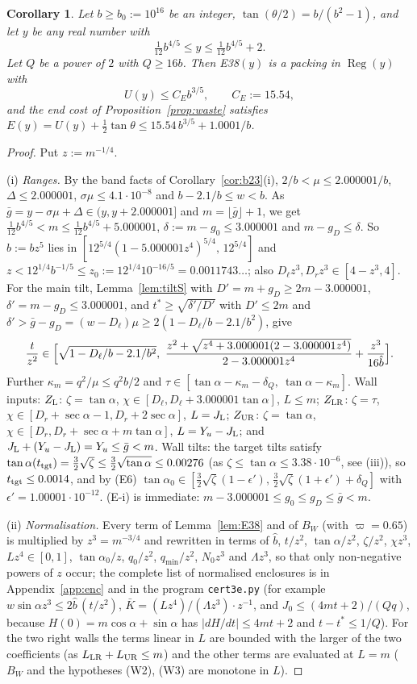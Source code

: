 \documentclass[11pt]{amsart}
\newcommand{\Reg}{\operatorname{Reg}}
\newcommand{\ca}{\cos\alpha}
\newcommand{\sa}{\sin\alpha}
\newcommand{\ta}{\tan\alpha}
\newcommand{\se}{\sec\alpha}
\newcommand{\taz}{\tan\alpha_0}
\newcommand{\Kb}{\bar K}
\newtheorem{corollary}[theorem]{Corollary}
\theoremstyle{definition}
\theoremstyle{remark}
\numberwithin{equation}{section}
\begin{document}
\begin{corollary}\label{cor:b35}
Let $b\ge b_0:=10^{16}$ be an integer, $\tan(\theta/2)=b/(b^2-1)$, and let $y$ be any real number with
\[
\tfrac1{12}b^{4/5}\le y\le\tfrac1{12}b^{4/5}+2 .
\]
Let $Q$ be a power of $2$ with $Q\ge16b$. Then E38$(y)$ is a packing in $\Reg(y)$ with
\[
U(y)\le C_Eb^{3/5},\qquad C_E:=15.54,
\]
and the end cost of Proposition~\ref{prop:waste} satisfies $E(y)=U(y)+\frac12\tan\theta\le15.54\,b^{3/5}+1.0001/b$.
\end{corollary}

\begin{proof}
Put $z:=m^{-1/4}$.

(i) \emph{Ranges.} By the band facts of Corollary~\ref{cor:b23}(i), $2/b<\mu\le2.000001/b$, $\Delta\le2.000001$,
$\sigma\mu\le4.1\cdot10^{-8}$ and $b-2.1/b\le w<b$. As $\bar g=y-\sigma\mu+\Delta\in(y,y+2.000001]$ and
$m=\lfloor\bar g\rfloor+1$, we get $\frac1{12}b^{4/5}<m\le\frac1{12}b^{4/5}+5.000001$, $\delta:=m-g_0\le3.000001$ and
$m-g_D\le\delta$. So $\hat b:=bz^5$ lies in $[12^{5/4}(1-5.000001z^4)^{5/4},\,12^{5/4}]$ and
$z<12^{1/4}b^{-1/5}\le z_0:=12^{1/4}10^{-16/5}=0.0011743\ldots$; also $D_\ell z^3,D_rz^3\in[4-z^3,4]$. For the main tilt,
Lemma~\ref{lem:tiltS} with $D'=m+g_D\ge2m-3.000001$, $\delta'=m-g_D\le3.000001$, and $t^*\ge\sqrt{\delta'/D'}$ with
$D'\le2m$ and $\delta'>\bar g-g_D=(w-D_\ell)\mu\ge2(1-D_\ell/b-2.1/b^2)$, give
\[
\frac t{z^2}\in\Bigl[\sqrt{1-D_\ell/b-2.1/b^2},\ \frac{z^2+\sqrt{z^4+3.000001(2-3.000001z^4)}}{2-3.000001z^4}
+\frac{z^3}{16\hat b}\Bigr].
\]
Further $\kappa_m=q^2/\mu\le q^2b/2$ and $\tau\in[\ta-\kappa_m-\delta_Q,\ \ta-\kappa_m]$. Wall inputs: $Z_{\rm L}$:
$\zeta=\ta$, $\chi\in[D_\ell,D_\ell+3.000001\ta]$, $L\le m$; $Z_{\rm LR}$: $\zeta=\tau$, $\chi\in[D_r+\se-1,D_r+2\se]$,
$L=J_{\rm L}$; $Z_{\rm UR}$: $\zeta=\ta$, $\chi\in[D_r,D_r+\se+m\ta]$, $L=Y_u-J_{\rm L}$; and
$J_{\rm L}+(Y_u-J_{\rm L})=Y_u\le\bar g<m$. Wall tilts: the target tilts satisfy
$\tan\alpha(t_{\rm tgt})=\frac32\sqrt\zeta\le\frac32\sqrt{\ta}\le0.00276$ (as $\zeta\le\ta\le3.38\cdot10^{-6}$, see (iii)),
so $t_{\rm tgt}\le0.0014$, and by (E6)
$\taz\in[\frac32\sqrt\zeta(1-\epsilon'),\,\frac32\sqrt\zeta(1+\epsilon')+\delta_Q]$ with $\epsilon'=1.00001\cdot10^{-12}$. (E-i) is immediate:
$m-3.000001\le g_0\le g_D\le\bar g<m$.

(ii) \emph{Normalisation.} Every term of Lemma~\ref{lem:E38} and of $B_W$ (with $\varpi=0.65$) is multiplied by
$z^3=m^{-3/4}$ and rewritten in terms of $\hat b$, $t/z^2$, $\ta/z^2$, $\zeta/z^2$, $\chi z^3$, $Lz^4\in[0,1]$, $\taz/z$,
$q_0/z^2$, $q_{\min}/z^2$, $N_0z^3$ and $\Lambda z^3$, so that only non-negative powers of $z$ occur; the complete list
of normalised enclosures is in Appendix~\ref{app:enc} and in the program \texttt{cert3e.py} (for example
$w\sa z^3\le2\hat b\,(t/z^2)$, $\Kb=(Lz^4)/(\Lambda z^3)\cdot z^{-1}$, and $J_0\le(4mt+2)/(Qq)$, because
$H(0)=m\ca+\sa$ has $|dH/dt|\le4mt+2$ and $t-t^*\le1/Q$). For the two right walls the terms linear in $L$ are bounded
with the larger of the two coefficients (as $L_{\rm LR}+L_{\rm UR}\le m$) and the other terms are evaluated at $L=m$
($B_W$ and the hypotheses (W2), (W3) are monotone in $L$).


\end{proof}
\end{document}
